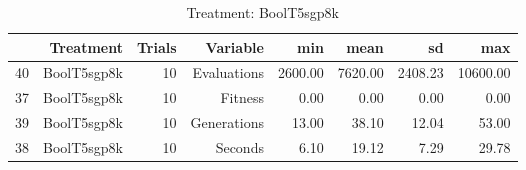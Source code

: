 \begin{table}[ht]
\centering
\begin{tabular}{rrrrrrrr}
  \hline
 & Treatment & Trials & Variable & min & mean & sd & max \\ 
  \hline
40 & BoolT5sgp8k &  10 & Evaluations & 2600.00 & 7620.00 & 2408.23 & 10600.00 \\ 
  37 & BoolT5sgp8k &  10 & Fitness & 0.00 & 0.00 & 0.00 & 0.00 \\ 
  39 & BoolT5sgp8k &  10 & Generations & 13.00 & 38.10 & 12.04 & 53.00 \\ 
  38 & BoolT5sgp8k &  10 & Seconds & 6.10 & 19.12 & 7.29 & 29.78 \\ 
   \hline
\end{tabular}
\caption{Treatment: BoolT5sgp8k} 
\end{table}
